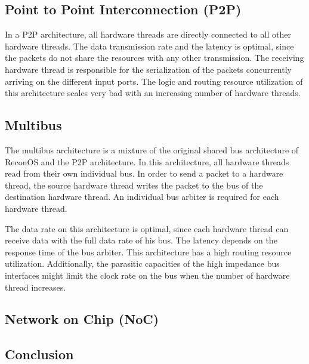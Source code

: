 \subsection{Point to Point Interconnection (P2P)}
In a P2P architecture, all hardware threads are directly connected to all other hardware threads. The data transmission rate and the latency is optimal, since the packets do not share the resources with any other transmission. The receiving hardware thread is responsible for the serialization of the packets concurrently arriving on the different input ports. The logic and routing resource utilization of this architecture scales very bad with an increasing number of hardware threads.

\subsection{Multibus}
The multibus architecture is a mixture of the original shared bus architecture of ReconOS and the P2P architecture. In this architecture, all hardware threads read from their own individual bus. In order to send a packet to a hardware thread, the source hardware thread writes the packet to the bus of the destination hardware thread. An individual bus arbiter is required for each hardware thread.

The data rate on this architecture is optimal, since each hardware thread can receive data with the full data rate of his bus. The latency depends on the response time of the bus arbiter. This architecture has a high routing resource utilization. Additionally, the parasitic capacities of the high impedance bus interfaces might limit the clock rate on the bus when the number of hardware thread increases.

\subsection{Network on Chip (NoC)}


\subsection{\label{designPrinciples:conclusion}Conclusion}